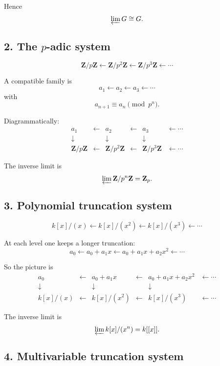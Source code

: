 \documentclass[12pt,a4paper]{article}
\theoremstyle{plain}
\theoremstyle{definition}      %
\begin{document}
	Hence
	\[
	\varprojlim G \cong G.
	\]
	
	\subsection*{2. The \(p\)-adic system}
	
	\[
	\mathbf Z/p\mathbf Z
	\xleftarrow{}
	\mathbf Z/p^2\mathbf Z
	\xleftarrow{}
	\mathbf Z/p^3\mathbf Z
	\xleftarrow{}\cdots
	\]
	
	A compatible family is
	\[
	a_1 \leftarrow a_2 \leftarrow a_3 \leftarrow \cdots
	\]
	with
	\[
	a_{n+1}\equiv a_n \pmod{p^n}.
	\]
	
	Diagrammatically:
	\[
	\begin{array}{cccccc}
		a_1 & \leftarrow & a_2 & \leftarrow & a_3 & \leftarrow \cdots \\
		\downarrow & & \downarrow & & \downarrow \\
		\mathbf Z/p\mathbf Z & \xleftarrow{} & \mathbf Z/p^2\mathbf Z & \xleftarrow{} & \mathbf Z/p^3\mathbf Z & \xleftarrow{}\cdots
	\end{array}
	\]
	
	The inverse limit is
	\[
	\varprojlim \mathbf Z/p^n\mathbf Z = \mathbf Z_p.
	\]
	
	\subsection*{3. Polynomial truncation system}
	
	\[
	k[x]/(x)
	\xleftarrow{}
	k[x]/(x^2)
	\xleftarrow{}
	k[x]/(x^3)
	\xleftarrow{}\cdots
	\]
	
	At each level one keeps a longer truncation:
	\[
	a_0
	\leftarrow
	a_0+a_1x
	\leftarrow
	a_0+a_1x+a_2x^2
	\leftarrow \cdots
	\]
	
	So the picture is
	\[
	\begin{array}{cccccc}
		a_0 & \leftarrow & a_0+a_1x & \leftarrow & a_0+a_1x+a_2x^2 & \leftarrow \cdots \\
		\downarrow & & \downarrow & & \downarrow \\
		k[x]/(x) & \xleftarrow{} & k[x]/(x^2) & \xleftarrow{} & k[x]/(x^3) & \xleftarrow{}\cdots
	\end{array}
	\]
	
	The inverse limit is
	\[
	\varprojlim k[x]/(x^n)=k[[x]].
	\]
	
	\subsection*{4. Multivariable truncation system}
	
\end{document}
